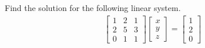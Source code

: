 \begin{exmp}
\label{ex:mulsol}
Find the solution for the following linear system.
\begin{align*}
\begin{bmatrix}
1 & 2 & 1 \\
2 & 5 & 3 \\
0 & 1 & 1 
\end{bmatrix}
\begin{bmatrix}
x \\
y \\
z
\end{bmatrix}
=
\begin{bmatrix}
1 \\
2 \\
0
\end{bmatrix}   
\end{align*}
\end{exmp}
